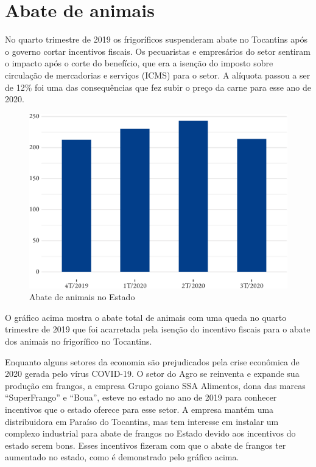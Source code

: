 \section{Abate de animais}

\par No quarto trimestre de 2019 os frigoríficos suspenderam abate no Tocantins após o governo cortar incentivos fiscais. Os pecuaristas e empresários do setor sentiram o impacto após o corte do benefício, que era a isenção do imposto sobre circulação de mercadorias e serviços (ICMS) para o setor. A alíquota passou a ser de 12\% foi uma das consequências que fez subir o preço da carne para esse ano de 2020.


\begin{figure}[h]
	\caption{Abate de animais no Estado}
	\includegraphics{fig/abate_total-1.pdf}
\end{figure}

\par O gráfico acima mostra o abate total de animais com uma queda no quarto trimestre de 2019 que foi acarretada pela isenção do incentivo fiscais para o abate dos animais no frigorífico no Tocantins. 

\par Enquanto alguns setores da economia são prejudicados pela crise econômica de 2020 gerada pelo vírus COVID-19. O setor do Agro se reinventa e expande sua produção em frangos, a empresa Grupo goiano SSA Alimentos, dona das marcas “SuperFrango” e “Boua”, esteve no estado no ano de 2019 para conhecer incentivos que o estado oferece para esse setor. A empresa mantém uma distribuidora em Paraíso do Tocantins, mas tem interesse em instalar um complexo industrial para abate de frangos no Estado devido aos incentivos do estado serem bons. Esses incentivos fizeram com que o abate de frangos ter aumentado no estado, como é demonstrado pelo gráfico acima.

